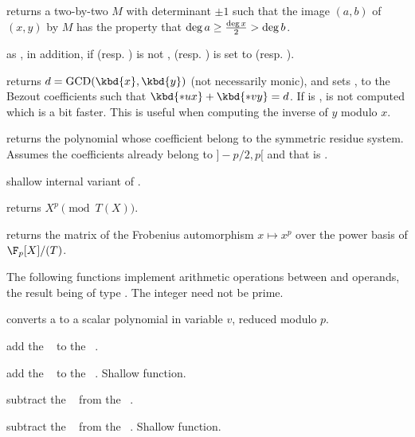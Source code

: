  returns a two-by-two 
$M$ with determinant $\pm 1$ such that the image $(a,b)$ of $(x,y)$ by $M$
has the property that $\deg a \geq {\deg x \over 2} > \deg b$.

as , in addition, if  (resp. ) is not
,  (resp. )
is set to  (resp. ).

 returns
$d = \text{GCD}(\kbd{x},\kbd{y})$ (not necessarily monic), and sets ,
 to the Bezout coefficients such that $\kbd{*ux} + \kbd{*vy} = d$.
If  is ,  is not computed which is a bit faster.
This is useful when computing the inverse of $y$ modulo $x$.

 returns the polynomial whose
coefficient belong to the symmetric residue system. Assumes the coefficients
already belong to $]-p/2, p[$ and that  is .

 shallow internal variant of
.

 returns $X^{p}\pmod{T(X)}$.

 returns the matrix of the
Frobenius automorphism $x\mapsto x^p$ over the power basis of $\F_p[X]/(T)$.

The following functions implement arithmetic operations between 
and  operands, the result being of type . The integer
 need not be prime.

 converts a  to a scalar
polynomial in variable $v$, reduced modulo $p$.

 add the ~ to the
~.

 add the ~
to the ~. Shallow function.

 subtract the ~ from
the ~.

 subtract the
~ from the ~. Shallow function.

